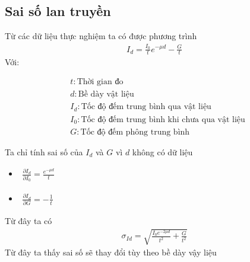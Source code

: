 \documentclass{article}
\begin{document}
\subsection{Sai số lan truyền}
Từ các dữ liệu thực nghiệm ta có được phương trình
\begin{align*}
	I_d = \frac{I_0}{t}e^{-\mu d} - \frac{G}{t}
\end{align*}
Với: \begin{fleqn}[\parindent]
\begin{equation*}
\begin{split}
	&t: \text{Thời gian đo} \\ 
	&d: \text{Bề dày vật liệu} \\
	&I_d: \text{Tốc độ đếm trung bình qua vật liệu} \\
	&I_0: \text{Tốc độ đếm trung bình khi chưa qua vật liệu} \\
	&G: \text{Tốc độ đếm phông trung bình}
\end{split}
\end{equation*}
\end{fleqn}
Ta chỉ tính sai số của $I_d$ và $G$ vì $d$ không có dữ liệu
\begin{itemize} 
	\item $\begin{aligned}
				 \frac{\partial I_d}{\partial I_0} = \frac{e^{-\mu d}}{t}
\end{aligned}$
	\item $\begin{aligned}
				 \frac{\partial I_d}{\partial G} = -\frac{1}{t}
\end{aligned}$
\end{itemize}
Từ đây ta có
\begin{align*}
	\sigma_{Id} = \sqrt{ \frac{I_0e^{-2\mu d}}{t^2} + \frac{G}{t^2} }
\end{align*}
Từ đây ta thấy sai số sẽ thay đổi tùy theo bề dày vậy liệu
\vspace{0.5cm}
\end{document}
